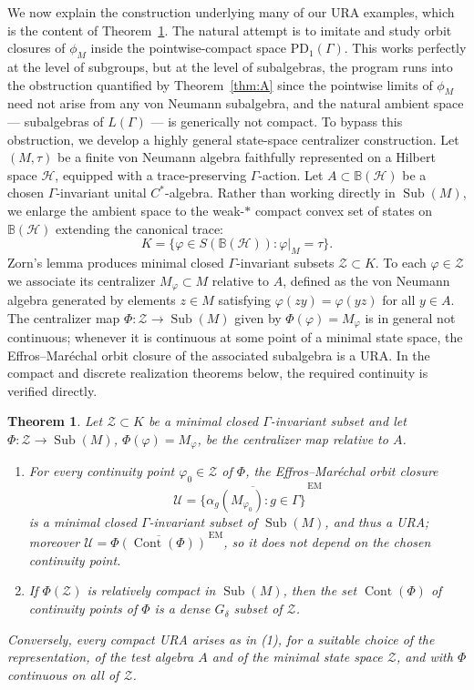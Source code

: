 \documentclass[12pt]{amsart} %
\theoremstyle{plain}
\newtheorem{theoremA}{Theorem}
\theoremstyle{definition}
\DeclareMathOperator{\Sub}{Sub}
\begin{document}
We now explain the construction underlying many of our URA examples, which is the content of Theorem~\ref{thm:D}. The natural attempt is to imitate \cite{AJ} and study orbit closures of $\phi_M$ inside the pointwise-compact space $\mathrm{PD}_1(\Gamma)$. This works perfectly at the level of subgroups, but at the level of subalgebras, the program runs into the obstruction quantified by Theorem~\ref{thm:A} since the pointwise limits of $\phi_M$ need not arise from any von Neumann subalgebra, and the natural ambient space --- subalgebras of $L(\Gamma)$ --- is generically not compact. To bypass this obstruction, we develop a highly general state-space centralizer construction. Let $(M,\tau)$ be a finite von Neumann algebra faithfully represented on a Hilbert space $\mathcal{H}$, equipped with a trace-preserving $\Gamma$-action. Let $A \subset \mathbb{B}(\mathcal{H})$ be a chosen $\Gamma$-invariant unital $C^*$-algebra. Rather than working directly in $\Sub(M)$, we enlarge the ambient space to the weak-$*$ compact convex set of states on $\mathbb{B}(\mathcal{H})$ extending the canonical trace:
$$ K = \{\varphi \in S(\mathbb{B}(\mathcal{H})) : \varphi|_{M} = \tau\}.$$
Zorn's lemma produces minimal closed $\Gamma$-invariant subsets $\mathcal{Z} \subset K$. To each $\varphi \in \mathcal{Z}$ we associate its centralizer $M_\varphi \subset M$ relative to $A$, defined as the von Neumann algebra generated by elements $z \in M$ satisfying $\varphi(zy) = \varphi(yz)$ for all $y \in A$. 
The centralizer map $\Phi: \mathcal{Z} \to \Sub(M)$ given by $\Phi(\varphi) = M_\varphi$ is in general not continuous; whenever it is continuous at some point of a minimal state space, the Effros--Mar\'echal orbit closure of the associated subalgebra is a URA. In the compact and discrete realization theorems below, the required continuity is verified directly. 
\begin{theoremA}\label{thm:D}
Let $\mathcal{Z} \subset K$ be a minimal closed $\Gamma$-invariant subset and let $\Phi:\mathcal{Z}\to\Sub(M)$, $\Phi(\varphi)=M_\varphi$, be the centralizer map relative to $A$.
\begin{enumerate}
\item For every continuity point $\varphi_0 \in \mathcal{Z}$ of $\Phi$, the Effros--Mar\'echal orbit closure
$$ \mathcal{U} = \overline{ \{ \alpha_g(M_{\varphi_0}) : g \in \Gamma \} }^{\,\mathrm{EM}} $$
is a minimal closed $\Gamma$-invariant subset of $\Sub(M)$, and thus a URA; moreover $\mathcal{U}=\overline{\Phi(\operatorname{Cont}(\Phi))}^{\,\mathrm{EM}}$, so it does not depend on the chosen continuity point.
\item If $\Phi(\mathcal{Z})$ is relatively compact in $\Sub(M)$, then the set $\operatorname{Cont}(\Phi)$ of continuity points of $\Phi$ is a dense $G_\delta$ subset of $\mathcal{Z}$.
\end{enumerate}
Conversely, every compact URA arises as in {\rm(1)}, for a suitable choice of the representation, of the test algebra $A$ and of the minimal state space $\mathcal{Z}$, and with $\Phi$ continuous on all of $\mathcal{Z}$.
\end{theoremA}
\end{document}
